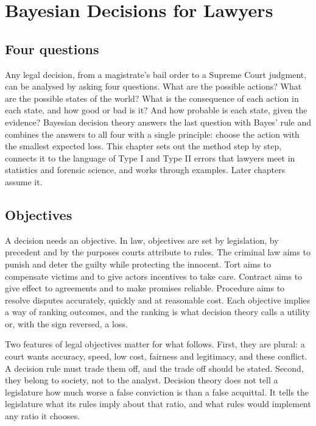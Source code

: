 \chapter{Bayesian Decisions for Lawyers}
\label{ch:decisions}

\section{Four questions}

Any legal decision, from a magistrate's bail order to a Supreme Court judgment, can be analysed by asking four questions. What are the possible actions? What are the possible states of the world? What is the consequence of each action in each state, and how good or bad is it? And how probable is each state, given the evidence? Bayesian decision theory answers the last question with Bayes' rule and combines the answers to all four with a single principle: choose the action with the smallest expected loss. This chapter sets out the method step by step, connects it to the language of Type I and Type II errors that lawyers meet in statistics and forensic science, and works through examples. Later chapters assume it.

\section{Objectives}

A decision needs an objective. In law, objectives are set by legislation, by precedent and by the purposes courts attribute to rules. The criminal law aims to punish and deter the guilty while protecting the innocent. Tort aims to compensate victims and to give actors incentives to take care. Contract aims to give effect to agreements and to make promises reliable. Procedure aims to resolve disputes accurately, quickly and at reasonable cost. Each objective implies a way of ranking outcomes, and the ranking is what decision theory calls a utility or, with the sign reversed, a loss.

Two features of legal objectives matter for what follows. First, they are plural: a court wants accuracy, speed, low cost, fairness and legitimacy, and these conflict. A decision rule must trade them off, and the trade off should be stated. Second, they belong to society, not to the analyst. Decision theory does not tell a legislature how much worse a false conviction is than a false acquittal. It tells the legislature what its rules imply about that ratio, and what rules would implement any ratio it chooses.

